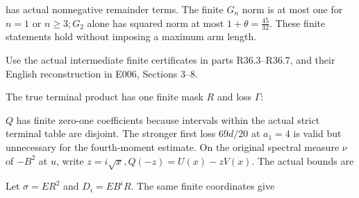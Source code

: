 
has actual nonnegative remainder terms. The finite \(G_n\) norm is at most one for \(n=1\) or \(n\ge 3; G_{2}\) alone has squared norm at most \(1+\theta=\frac{45}{32}\). These finite statements hold without imposing a maximum arm length.

Use the actual intermediate finite certificates in parts R36.3–R36.7, and their English reconstruction in E006, Sections 3–8.

The true terminal product has one finite mask \(R\) and loss \(\Gamma\):


\(Q\) has finite zero-one coefficients because intervals within the actual strict terminal table are disjoint. The stronger first loss \(69d/20\) at \(a_{1}=4\) is valid but unnecessary for the fourth-moment estimate. On the original spectral measure \(\nu\) of \(-B^2\) at \(u\), write \(z=i \sqrt{x},\allowbreak \allowbreak  Q(-z)=U(x)-zV(x)\). The actual bounds are


Let \(\sigma=ER^2\) and \(D_i=EB^iR\). The same finite coordinates give



